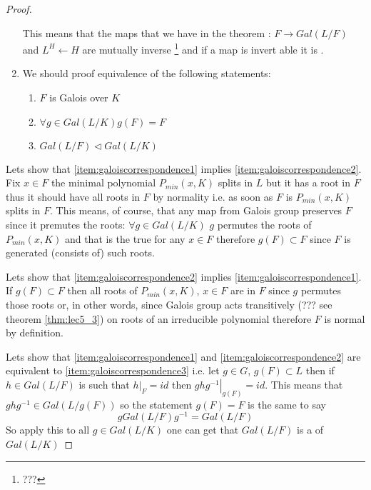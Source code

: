 \begin{theorem}
\begin{proof}
\begin{enumerate}
      This means that the maps that we have in the theorem :
      $F \rightarrow Gal\left(L/F\right)$ and
      $L^H \leftarrow H$ are mutually inverse
      \footnote{
        ???
      }
      and if a map is invert able it is .
    \item We should proof equivalence of the following statements:
      \begin{enumerate}
      \item $F$ is Galois over $K$ \label{item:galoiscorrespondence1}
      \item $\forall g \in Gal\left(L/K\right) g\left(F\right) = F$
        \label{item:galoiscorrespondence2}
      \item $Gal\left(L/F\right) \triangleleft Gal\left(L/K\right)$
        \label{item:galoiscorrespondence3}
      \end{enumerate}      
    \end{enumerate}

    Lets show that \ref{item:galoiscorrespondence1} implies
    \ref{item:galoiscorrespondence2}. Fix $x \in F$ the minimal
    polynomial $P_{min}\left(x, K\right)$ splits in $L$ but it has a
    root in $F$ thus it should have all roots in $F$ by normality
    i.e. as soon as $F$ is 
    $P_{min}\left(x, K\right)$ splits in $F$. This means, of course,
    that any map from Galois group preserves $F$ since it premutes the
    roots: $\forall g \in Gal\left(L/K\right)$ $g$ permutes the roots
    of $P_{min}\left(x, K\right)$ and that is the true for any $x \in
    F$ therefore $g\left(F\right) \subset F$ since $F$ is generated
    (consists of) such roots.

    Lets show that \ref{item:galoiscorrespondence2} implies
    \ref{item:galoiscorrespondence1}. If $g\left(F\right) \subset F$
    then all roots of $P_{min}\left(x, K\right)$, $x \in F$ are in $F$
    since $g$ permutes those roots or, in other words, since Galois
    group acts transitively (??? see theorem \ref{thm:lec5_3}) on
    roots of an irreducible polynomial therefore $F$ is normal by
    definition.

    Lets show that \ref{item:galoiscorrespondence1} and
    \ref{item:galoiscorrespondence2} are equivalent to
    \ref{item:galoiscorrespondence3} i.e. let $g \in G$,
    $g\left(F\right) \subset L$ then if
    $h \in Gal\left(L/F\right)$ is such that $\left.h\right|_F = id$
    then $\left.g h g^{-1}\right|_{g\left(F\right)} = id$. This means
    that $g h g^{-1} \in Gal\left(L/g\left(F\right)\right)$ so the
    statement $g\left(F\right) = F$ is the same to say
    \[
    g Gal\left(L/F\right) g^{-1} = Gal\left(L/F\right)
    \]
    So apply this to all $g \in Gal\left(L/K\right)$ one can get that
    $Gal\left(L/F\right)$ is a  of
    $Gal\left(L/K\right)$


\end{proof}
\end{theorem}
